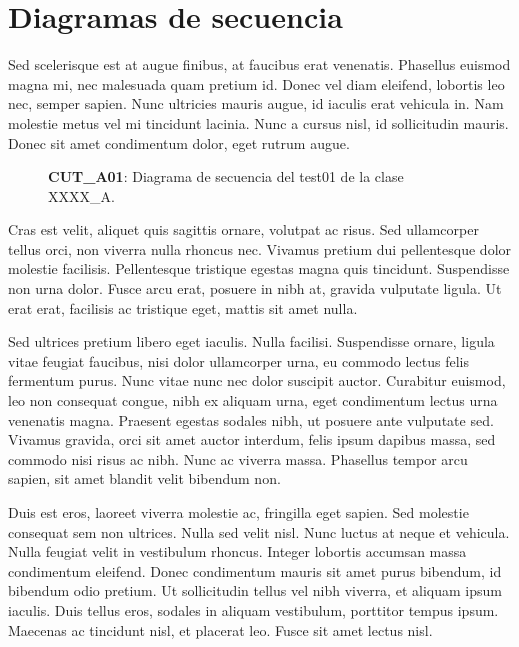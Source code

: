 \documentclass[../informe.tex]{subfiles}
\begin{document}
\section{Diagramas de secuencia}\label{sec:diagramasdesecuencia}

Sed scelerisque est at augue finibus, at faucibus erat venenatis. Phasellus euismod magna mi, nec malesuada quam pretium id. Donec vel diam eleifend, lobortis leo nec, semper sapien. Nunc ultricies mauris augue, id iaculis erat vehicula in. Nam molestie metus vel mi tincidunt lacinia. Nunc a cursus nisl, id sollicitudin mauris. Donec sit amet condimentum dolor, eget rutrum augue.

\begin{figure}[H]
    \centering
    
    \caption{\label{dsCUTA01}\textbf{CUT\_A01}: Diagrama de secuencia del test01 de la clase XXXX\_A.}
\end{figure}


Cras est velit, aliquet quis sagittis ornare, volutpat ac risus. Sed ullamcorper tellus orci, non viverra nulla rhoncus nec. Vivamus pretium dui pellentesque dolor molestie facilisis. Pellentesque tristique egestas magna quis tincidunt. Suspendisse non urna dolor. Fusce arcu erat, posuere in nibh at, gravida vulputate ligula. Ut erat erat, facilisis ac tristique eget, mattis sit amet nulla.

Sed ultrices pretium libero eget iaculis. Nulla facilisi. Suspendisse ornare, ligula vitae feugiat faucibus, nisi dolor ullamcorper urna, eu commodo lectus felis fermentum purus. Nunc vitae nunc nec dolor suscipit auctor. Curabitur euismod, leo non consequat congue, nibh ex aliquam urna, eget condimentum lectus urna venenatis magna. Praesent egestas sodales nibh, ut posuere ante vulputate sed. Vivamus gravida, orci sit amet auctor interdum, felis ipsum dapibus massa, sed commodo nisi risus ac nibh. Nunc ac viverra massa. Phasellus tempor arcu sapien, sit amet blandit velit bibendum non.

Duis est eros, laoreet viverra molestie ac, fringilla eget sapien. Sed molestie consequat sem non ultrices. Nulla sed velit nisl. Nunc luctus at neque et vehicula. Nulla feugiat velit in vestibulum rhoncus. Integer lobortis accumsan massa condimentum eleifend. Donec condimentum mauris sit amet purus bibendum, id bibendum odio pretium. Ut sollicitudin tellus vel nibh viverra, et aliquam ipsum iaculis. Duis tellus eros, sodales in aliquam vestibulum, porttitor tempus ipsum. Maecenas ac tincidunt nisl, et placerat leo. Fusce sit amet lectus nisl.
\end{document}
